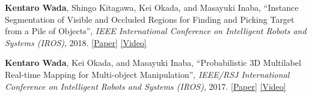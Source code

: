 \documentclass[letterpaper,MMMyyyy,nonstop]{simpleresumecv}
\begin{document}
\begin{body}
\GapNoBreak

\textbf{Kentaro Wada}, Shingo Kitagawa, Kei Okada, and Masayuki Inaba,
``Instance Segmentation of Visible and Occluded Regions for Finding and Picking Target from a Pile of Objects'',
\textit{IEEE International Conference on Intelligent Robots and Systems (IROS)}, 2018.
\href{https://arxiv.org/abs/2001.07475}{\underline{[Paper]}}
\href{https://youtu.be/tNLtXb04i3w}{\underline{[Video]}}

\GapNoBreak

\textbf{Kentaro Wada}, Kei Okada, and Masayuki Inaba,
``Probabilistic 3D Multilabel Real-time Mapping for Multi-object Manipulation'',
\textit{IEEE/RSJ International Conference on Intelligent Robots and Systems (IROS)}, 2017.
\href{https://arxiv.org/abs/2001.05752}{\underline{[Paper]}}
\href{https://youtu.be/T-vtVQT9sgc}{\underline{[Video]}}


\GapNoBreak



\end{body}
\end{document}
